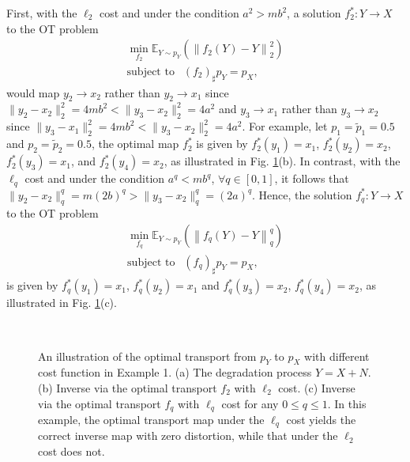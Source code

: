 \documentclass[10pt,journal,compsoc]{IEEEtran}
\begin{document}
First, with the $\ell_2$ cost and under the condition $a^2>mb^2$,
a solution $f_2^*:Y\rightarrow X$ to the OT problem
\begin{equation}
\begin{gathered}
  \mathop {\min }\limits_{f_2} {\mathbb{E}_{Y \sim {p_Y}}}\left(\left\|f_2(Y)-Y\right\|^2_2\right) \\
  {\text{subject \ to \ }}~~(f_2)_{\sharp}{p_Y} = {p_X},
\end{gathered}
\label{eq_sot_examp_f2}
\end{equation}
would map $y_2\rightarrow x_2$ rather than $y_2\rightarrow x_1$ since
$\|y_2-x_2\|^2_2=4mb^2<\|y_3-x_2\|^2_2=4a^2$ and $y_3\rightarrow x_1$
rather than $y_3\rightarrow x_2$ since $\|y_3-x_1\|^2_2=4mb^2<\|y_3-x_2\|^2_2=4a^2$.
For example, let $p_1=\tilde{p}_1=0.5$ and $p_2=\tilde{p}_2=0.5$,
the optimal map $f_2^*$ is given by $f_2^*(y_1)=x_1$, $f_2^*(y_2)=x_2$,
$f_2^*(y_3)=x_1$, and $f_2^*(y_4)=x_2$, as illustrated in Fig. \ref{fig_example}(b).
In contrast, with the $\ell_{q}$ cost and under the condition $a^q<mb^q$, $\forall q\in[0,1]$,
it follows that $\|y_2-x_2\|^q_q=m(2b)^q>\|y_3-x_2\|^q_q=(2a)^q$.
Hence, the solution $f_q^*:Y\rightarrow X$ to the OT problem
\begin{equation}
\begin{gathered}
  \mathop {\min }\limits_{f_q} {\mathbb{E}_{Y \sim {p_Y}}}\left(\left\|f_q(Y)-Y\right\|^q_q\right) \\
  {\text{subject \ to \ }}~~(f_q)_{\sharp}{p_Y} = {p_X},
\end{gathered}
\label{eq_sot_examp_fq}
\end{equation}
is given by $f_q^*(y_1)=x_1$, $f_q^*(y_2)=x_1$ and
$f_q^*(y_3)=x_2$, $f_q^*(y_4)=x_2$, 
as illustrated in Fig. \ref{fig_example}(c).

\begin{figure}[!t]
	\centering
	~~~~
         ~~~~
	\caption{An illustration of the optimal transport from $p_Y$ to
$p_X$ with different cost function in Example 1. (a) The degradation process $Y=X+N$. (b) Inverse via the optimal transport $f_2$ with $\ell_2$ cost. (c) Inverse via the optimal transport $f_q$ with $\ell_q$ cost for any $0\leq q \leq 1$. In this example, the optimal transport map under the $\ell_q$ cost yields the correct inverse map with zero distortion, while that under the $\ell_2$ cost does not.}
	\label{fig_example}
\end{figure}
\end{document}
